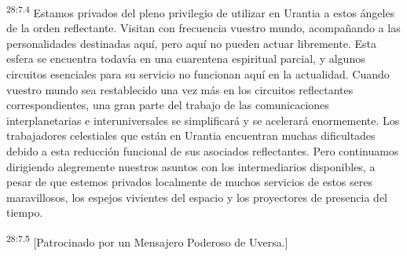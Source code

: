 \par
\textsuperscript{28:7.4} Estamos privados del pleno privilegio de utilizar en Urantia a estos ángeles de la orden reflectante. Visitan con frecuencia vuestro mundo, acompañando a las personalidades destinadas aquí, pero aquí no pueden actuar libremente. Esta esfera se encuentra todavía en una cuarentena espiritual parcial, y algunos circuitos esenciales para su servicio no funcionan aquí en la actualidad. Cuando vuestro mundo sea restablecido una vez más en los circuitos reflectantes correspondientes, una gran parte del trabajo de las comunicaciones interplanetarias e interuniversales se simplificará y se acelerará enormemente. Los trabajadores celestiales que están en Urantia encuentran muchas dificultades debido a esta reducción funcional de sus asociados reflectantes. Pero continuamos dirigiendo alegremente nuestros asuntos con los intermediarios disponibles, a pesar de que estemos privados localmente de muchos servicios de estos seres maravillosos, los espejos vivientes del espacio y los proyectores de presencia del tiempo.

\par
\textsuperscript{28:7.5} [Patrocinado por un Mensajero Poderoso de Uversa.]